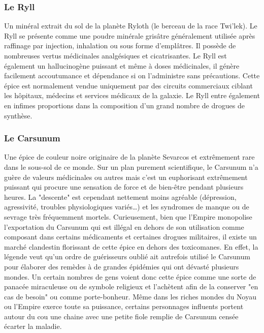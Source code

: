 \documentclass[twoside]{article}
\begin{document}
\subsubsection{Le Ryll}
Un minéral extrait du sol de la planète Ryloth (le berceau de la race Twi'lek). Le Ryll se présente comme une poudre minérale grisâtre généralement utilisée après raffinage par injection, inhalation ou sous forme d'emplâtres. Il possède de nombreuses vertus médicinales analgésiques et cicatrisantes. Le Ryll est également un hallucinogène puissant et même à doses médicinales, il génère facilement accoutumance et dépendance si on l'administre sans précautions. Cette épice est normalement vendue uniquement par des circuits commerciaux ciblant les hôpitaux, médecins et services médicaux de la galaxie. Le Ryll entre également en infimes proportions dans la composition d'un grand nombre de drogues de synthèse. 

\subsubsection{Le Carsunum}
Une épice de couleur noire originaire de la planète Sevarcos et extrêmement rare dans le sous-sol de ce monde. Sur un plan purement scientifique, le Carsunum n'a guère de valeurs médicinales ou autres mais c'est un euphorisant extrêmement puissant qui procure une sensation de force et de bien-être pendant plusieurs heures. La "descente" est cependant nettement moins agréable (dépression, agressivité, troubles physiologiques variés\ldots) et les syndromes de manque ou de sevrage très fréquemment mortels. Curieusement, bien que l'Empire monopolise l'exportation du Carsunum qui est illégal en dehors de son utilisation comme composant dans certains médicaments et certaines drogues militaires, il existe un marché clandestin florissant de cette épice en dehors des toxicomanes.
En effet, la légende veut qu'un ordre de guérisseurs oublié ait autrefois utilisé le Carsunum pour élaborer des remèdes à de grandes épidémies qui ont dévasté plusieurs mondes. Un certain nombres de gens voient donc cette épice comme une sorte de panacée miraculeuse ou de symbole religieux et l'achètent afin de la conserver "en cas de besoin" ou comme porte-bonheur. Même dans les riches mondes du Noyau ou l'Empire exerce toute sa puissance, certains personnages influents portent autour du cou une chaine avec une petite fiole remplie de Carsunum censée écarter la maladie.
\end{document}

